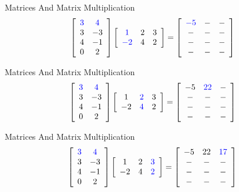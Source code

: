 \begin{frame}{Matrices And Matrix Multiplication}
\[ \left[ \begin{array}{cc} \textcolor{blue}{ 3 } & \textcolor{blue}{ 4 }  \\ 3 & -3  \\ 4 & -1  \\ 0 & 2 \end{array} \right]  \left[ \begin{array}{ccc} \textcolor{blue}{ 1 } & 2 & 3  \\ \textcolor{blue}{ -2 } & 4 & 2 \end{array} \right]   =  \left[ \begin{array}{ccc} \textcolor{blue}{ -5 } & - & -  \\ - & - & -  \\ - & - & -  \\ - & - & - \end{array} \right]  \]
\end{frame}


\begin{frame}{Matrices And Matrix Multiplication}
\[ \left[ \begin{array}{cc} \textcolor{blue}{ 3 } & \textcolor{blue}{ 4 }  \\ 3 & -3  \\ 4 & -1  \\ 0 & 2 \end{array} \right]  \left[ \begin{array}{ccc} 1 & \textcolor{blue}{ 2 } & 3  \\ -2 & \textcolor{blue}{ 4 } & 2 \end{array} \right]   =  \left[ \begin{array}{ccc} -5 & \textcolor{blue}{ 22 } & -  \\ - & - & -  \\ - & - & -  \\ - & - & - \end{array} \right]  \]
\end{frame}


\begin{frame}{Matrices And Matrix Multiplication}
\[ \left[ \begin{array}{cc} \textcolor{blue}{ 3 } & \textcolor{blue}{ 4 }  \\ 3 & -3  \\ 4 & -1  \\ 0 & 2 \end{array} \right]  \left[ \begin{array}{ccc} 1 & 2 & \textcolor{blue}{ 3 }  \\ -2 & 4 & \textcolor{blue}{ 2 } \end{array} \right]   =  \left[ \begin{array}{ccc} -5 & 22 & \textcolor{blue}{ 17 }  \\ - & - & -  \\ - & - & -  \\ - & - & - \end{array} \right]  \]
\end{frame}


